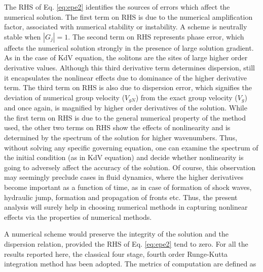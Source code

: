 \documentclass{svjour3}                    %
\begin{document}
The RHS of Eq. \eqref{eq:epe2} identifies the sources of errors which affect the numerical solution. The first term on RHS is due to the numerical amplification factor, associated with numerical stability or instability. A scheme is neutrally stable when $|G_j| = 1$. The second term on RHS 
represents phase error, which affects the numerical solution strongly in the presence of large solution gradient. As in the case of KdV equation, 
the solitons are the sites of large higher order derivative values. Although this third derivative term determines dispersion, still it encapsulates 
the nonlinear effects due to dominance of the higher derivative term. The third term on RHS is also due to dispersion error, which signifies the 
deviation of numerical group velocity ($V_{gN}$) from the exact group velocity ($V_g$) and once again, is magnified by higher order derivatives of the solution. While the first term on RHS is due to the general numerical property of the method used, the other two terms on RHS 
show the effects of nonlinearity and is determined by the spectrum of the solution for higher wavenumbers. Thus, without solving any specific 
governing equation, one can examine the spectrum of the initial condition (as in KdV equation) and decide whether nonlinearity is going to adversely 
affect the accuracy of the solution. Of course, this observation may seemingly preclude cases in fluid dynamics, where the higher derivatives become important as a function of time, as in case of formation of shock waves, hydraulic jump, formation and propagation of fronts etc. Thus, the present analysis will surely help in choosing numerical methods in capturing nonlinear effects via the properties of numerical methods.

A numerical scheme would preserve the integrity of the solution and the dispersion relation, provided the RHS of Eq. \eqref{eq:epe2} tend to zero. 
For all the results reported here, the classical four stage, fourth order Runge-Kutta integration method has been adopted. The metrics of computation 
are defined as 
\end{document}

